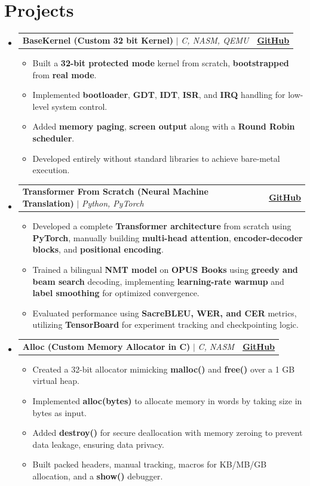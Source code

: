 \documentclass[letterpaper,11pt]{article}
\makeatletter
\newcommand{\resumeItem}[1]{
  \item\small{
    {#1 \vspace{-1pt}}
  }
}
\newcommand{\resumeProjectHeading}[2]{ 
    \item
    \begin{tabular*}{1.001\textwidth}{l@{\extracolsep{\fill}}r}
      \small#1 & \textbf{\small #2}\\
    \end{tabular*}\vspace{-6pt}
} %
\newcommand{\resumeSubHeadingListStart}{\begin{itemize}[leftmargin=0.0in, label={}]}
\newcommand{\resumeSubHeadingListEnd}{\end{itemize}}
\newcommand{\resumeItemListStart}{\begin{itemize}}
\newcommand{\resumeItemListEnd}{\end{itemize}\vspace{-4pt}}
\makeatother
\begin{document}
\section{Projects}
    \vspace{-7pt}
    \resumeSubHeadingListStart
        \resumeProjectHeading
            {\textbf{\normalsize{BaseKernel (Custom 32 bit Kernel)}} $|$ \emph{C, NASM, QEMU}}{\href{https://github.com/ankushhKapoor/BaseKernel}{\underline{GitHub}}}
            \resumeItemListStart
                \resumeItem{Built a \textbf{32-bit protected mode} kernel from scratch, \textbf{bootstrapped} from \textbf{real mode}.}
            \resumeItem{Implemented \textbf{bootloader}, \textbf{GDT}, \textbf{IDT}, \textbf{ISR}, and \textbf{IRQ} handling for low-level system control.}
                \resumeItem{Added \textbf{memory paging}, \textbf{screen output} along with a \textbf{Round Robin scheduler}.}
                \resumeItem{Developed entirely without standard libraries to achieve bare-metal execution.}
            \resumeItemListEnd
        \vspace{-13pt}

                \resumeProjectHeading
            {\textbf{\normalsize{Transformer From Scratch (Neural Machine Translation)}} $|$ \emph{Python, PyTorch}}{\href{https://github.com/ankushhKapoor/transformer-from-scratch}{\underline{GitHub}}}
            \resumeItemListStart
               \resumeItem{Developed a complete \textbf{Transformer architecture} from scratch using \textbf{PyTorch}, manually building \textbf{multi-head attention}, \textbf{encoder-decoder blocks}, and \textbf{positional encoding}.}
                \resumeItem{Trained a bilingual \textbf{NMT model} on \textbf{OPUS Books} using \textbf{greedy and beam search} decoding, implementing \textbf{learning-rate warmup} and \textbf{label smoothing} for optimized convergence.}
                \resumeItem{Evaluated performance using \textbf{SacreBLEU, WER, and CER} metrics, utilizing \textbf{TensorBoard} for experiment tracking and checkpointing logic.}
            \resumeItemListEnd
        \vspace{-13pt}

        \resumeProjectHeading
            {\textbf{\normalsize{Alloc (Custom Memory Allocator in C)}} $|$ \emph{C, NASM}}{\href{https://github.com/ankushhKapoor/alloc}{\underline{GitHub}}}
            \resumeItemListStart
        \resumeItem{Created a 32-bit allocator mimicking \textbf{malloc()} and \textbf{free()} over a 1 GB virtual heap.}
                \resumeItem{Implemented \textbf{alloc(bytes)} to allocate memory in words by taking size in bytes as input.}
                \resumeItem{Added \textbf{destroy()} for secure deallocation with memory zeroing to prevent data leakage, ensuring data privacy.}
                \resumeItem{Built packed headers, manual tracking, macros for KB/MB/GB allocation, and a \textbf{show()} debugger.}
            \resumeItemListEnd
        \resumeSubHeadingListEnd
        \vspace{-12pt}
        
\end{document}
